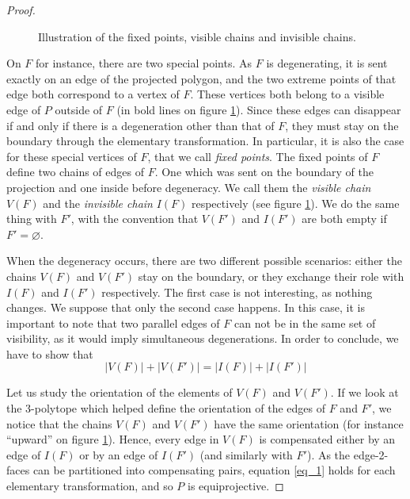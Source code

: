 \documentclass[12pt, notitlepage]{article}
\theoremstyle{plain}
\theoremstyle{definition}
\theoremstyle{plain}
\theoremstyle{remark}
\theoremstyle{plain}
\theoremstyle{plain}
\begin{document}
\begin{proof}
\begin{figure}[ht]
\begin{tikzpicture}[x=0.75pt,y=0.75pt,yscale=-1,xscale=1]
\end{tikzpicture}
    \caption{Illustration of the fixed points, visible chains and invisible chains.}
    \label{visibility}
    \end{figure}
    
    On $F$ for instance, there are two special points. As $F$ is degenerating, it is sent exactly on an edge of the projected polygon, and the two extreme points of that edge both correspond to a vertex of $F$. These vertices both belong to a visible edge of $P$ outside of $F$ (in bold lines on figure \ref{visibility}). Since these edges can disappear if and only if there is a degeneration other than that of $F$, they must stay on the boundary through the elementary transformation. In particular, it is also the case for these special vertices of $F$, that we call \emph{fixed points}. The fixed points of $F$ define two chains of edges of $F$. One which was sent on the boundary of the projection and one inside before degeneracy. We call them the \emph{visible chain} $V(F)$ and the \emph{invisible chain} $I(F)$ respectively (see figure \ref{visibility}). We do the same thing with $F'$, with the convention that $V(F')$ and $I(F')$ are both empty if $F'=\varnothing$.
    
    When the degeneracy occurs, there are two different possible scenarios: either the chains $V(F)$ and $V(F')$ stay on the boundary, or they exchange their role with $I(F)$ and $I(F')$ respectively. The first case is not interesting, as nothing changes. We suppose that only the second case happens. In this case, it is important to note that two parallel edges of $F$ can not be in the same set of visibility, as it would imply simultaneous degenerations. In order to conclude, we have to show that \begin{equation}
        \label{eq_1} |V(F)| + |V(F')| = |I(F)| + |I(F')| 
    \end{equation}
    
    Let us study the orientation of the elements of $V(F)$ and $V(F')$. If we look at the 3-polytope which helped define the orientation of the edges of $F$ and $F'$, we notice that the chains $V(F)$ and $V(F')$ have the same orientation (for instance “upward” on figure \ref{visibility}). Hence, every edge in $V(F)$ is compensated either by an edge of $I(F)$ or by an edge of $I(F')$ (and similarly with $F'$). As the edge-2-faces can be partitioned into compensating pairs, equation \eqref{eq_1} holds for each elementary transformation, and so $P$ is equiprojective.
\end{proof}
\end{document}
